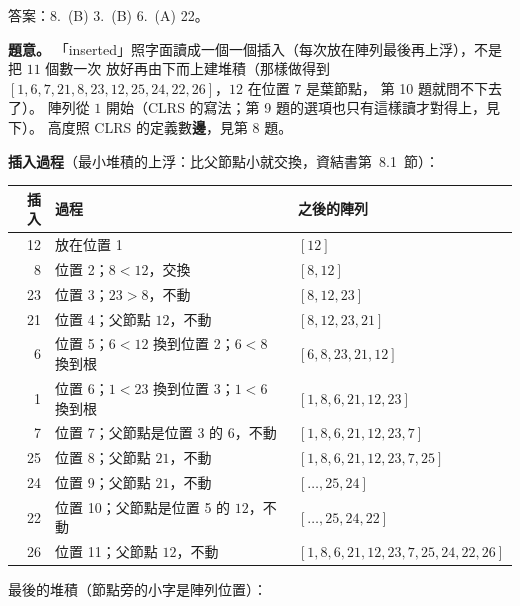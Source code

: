 \begin{pastsoln}
答案：8.~(B) 3.~(B) 6.~(A) 22。

\textbf{題意。} 「inserted」照字面讀成一個一個插入（每次放在陣列最後再上浮），不是把 $11$ 個數一次
放好再由下而上建堆積（那樣做得到 $[1, 6, 7, 21, 8, 23, 12, 25, 24, 22, 26]$，$12$ 在位置 $7$ 是葉節點，
第 10 題就問不下去了）。 陣列從 $1$ 開始（CLRS 的寫法；第 9 題的選項也只有這樣讀才對得上，見下）。
高度照 CLRS 的定義數\textbf{邊}，見第 8 題。

\textbf{插入過程}（最小堆積的上浮：比父節點小就交換，資結書第~8.1~節）：
\begin{center}
\small
\begin{tabular}{rll}
\toprule
插入 & 過程 & 之後的陣列 \\
\midrule
12 & 放在位置 1 & $[12]$ \\
8 & 位置 2；$8 < 12$，交換 & $[8, 12]$ \\
23 & 位置 3；$23 > 8$，不動 & $[8, 12, 23]$ \\
21 & 位置 4；父節點 $12$，不動 & $[8, 12, 23, 21]$ \\
6 & 位置 5；$6 < 12$ 換到位置 2；$6 < 8$ 換到根 & $[6, 8, 23, 21, 12]$ \\
1 & 位置 6；$1 < 23$ 換到位置 3；$1 < 6$ 換到根 & $[1, 8, 6, 21, 12, 23]$ \\
7 & 位置 7；父節點是位置 3 的 $6$，不動 & $[1, 8, 6, 21, 12, 23, 7]$ \\
25 & 位置 8；父節點 $21$，不動 & $[1, 8, 6, 21, 12, 23, 7, 25]$ \\
24 & 位置 9；父節點 $21$，不動 & $[\ldots, 25, 24]$ \\
22 & 位置 10；父節點是位置 5 的 $12$，不動 & $[\ldots, 25, 24, 22]$ \\
26 & 位置 11；父節點 $12$，不動 & $[1, 8, 6, 21, 12, 23, 7, 25, 24, 22, 26]$ \\
\bottomrule
\end{tabular}
\end{center}
最後的堆積（節點旁的小字是陣列位置）：
\begin{center}
\end{center}


\end{pastsoln}
